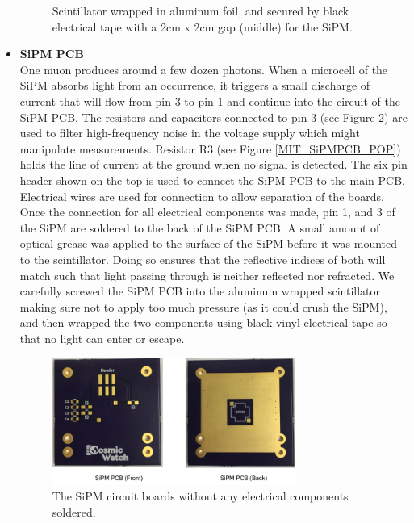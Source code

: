 \begin{itemize}
\begin{figure}[htb]
\caption{Scintillator wrapped in aluminum foil, and secured by black electrical tape with a 2cm x 2cm gap (middle) for the SiPM.}
\label{MIT_WrappedScintillator}
\end{figure}
\item {\bf SiPM PCB } \\
One muon produces around a few dozen photons. When a microcell of the SiPM absorbs light from an occurrence, it triggers a small discharge of current that will flow from pin 3 to pin 1 and continue into the circuit of the SiPM PCB. The resistors and capacitors connected to pin 3 (see Figure \ref{MIT_SiPMPCB}) are used to filter high-frequency noise in the voltage supply which might manipulate measurements. Resistor R3 (see Figure \ref{MIT_SiPMPCB_POP}) holds the line of current at the ground when no signal is detected. The six pin header shown on the top is used to connect the SiPM PCB to the main PCB. Electrical wires are used for connection to allow separation of the boards. 
Once the connection for all electrical components was made, pin 1, and 3 of the SiPM are soldered to the back of the SiPM PCB. A small amount of optical grease was applied to the surface of the SiPM before it was mounted to the scintillator. Doing so ensures that the reflective indices of both will match such that light passing through is neither reflected nor refracted. We carefully screwed the SiPM PCB into the aluminum wrapped scintillator making sure not to apply too much pressure (as it could crush the SiPM), and then wrapped the two components using black vinyl electrical tape so that no light can enter or escape. 
\begin{figure}[htb]
\centering
\includegraphics[width=0.75\textwidth]{images/SiPMPCB.png} 
\caption{The SiPM circuit boards without any electrical components soldered.}
\label{MIT_SiPMPCB}
\end{figure}
\begin{figure}[htb]
\centering

\end{figure}
\end{itemize}
